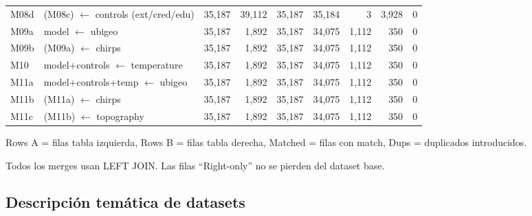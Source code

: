 \documentclass[11pt,a4paper]{article}
\begin{document}
\begin{landscape}
\begin{table}[H]
\begin{threeparttable}
\begin{tabular}{llrrrrrrr}
M08d & (M08c) $\leftarrow$ controls (ext/cred/edu) & 35,187 & 39,112 & 35,187 & 35,184 & 3 & 3,928 & 0 \\
M09a & model $\leftarrow$ ubigeo & 35,187 & 1,892 & 35,187 & 34,075 & 1,112 & 350 & 0 \\
M09b & (M09a) $\leftarrow$ chirps & 35,187 & 1,892 & 35,187 & 34,075 & 1,112 & 350 & 0 \\
M10 & model+controls $\leftarrow$ temperature & 35,187 & 1,892 & 35,187 & 34,075 & 1,112 & 350 & 0 \\
M11a & model+controls+temp $\leftarrow$ ubigeo & 35,187 & 1,892 & 35,187 & 34,075 & 1,112 & 350 & 0 \\
M11b & (M11a) $\leftarrow$ chirps & 35,187 & 1,892 & 35,187 & 34,075 & 1,112 & 350 & 0 \\
M11c & (M11b) $\leftarrow$ topography & 35,187 & 1,892 & 35,187 & 34,075 & 1,112 & 350 & 0 \\
\bottomrule
\end{tabular}
\begin{tablenotes}
\footnotesize
\item Rows A = filas tabla izquierda, Rows B = filas tabla derecha, Matched = filas con match, Dups = duplicados introducidos.
\item Todos los merges usan LEFT JOIN. Las filas ``Right-only'' no se pierden del dataset base.
\end{tablenotes}
\end{threeparttable}
\end{table}
\end{landscape}

\subsection{Descripción temática de datasets}
\end{document}
